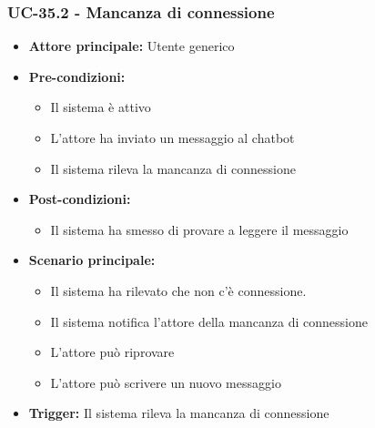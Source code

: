 \documentclass[a4paper,12pt]{article}
\begin{document}
\subsubsection{UC-35.2 - Mancanza di connessione} \label{sec:UC-35.2}
\begin{itemize}
    \item \textbf{Attore principale:} Utente generico
    \item \textbf{Pre-condizioni:}
    \begin{itemize}
        \item Il sistema è attivo
        \item L'attore ha inviato un messaggio al chatbot
        \item Il sistema rileva la mancanza di connessione
    \end{itemize}
    \item \textbf{Post-condizioni:}
    \begin{itemize}
        \item Il sistema ha smesso di provare a leggere il messaggio
    \end{itemize}
    \item \textbf{Scenario principale:} 
    \begin{itemize}
        \item Il sistema ha rilevato che non c’è connessione.
        \item Il sistema notifica l'attore della mancanza di connessione
        \item L'attore può riprovare
        \item L'attore può scrivere un nuovo messaggio
    \end{itemize}
    \item \textbf{Trigger:} Il sistema rileva la mancanza di connessione
\end{itemize}
\end{document}
